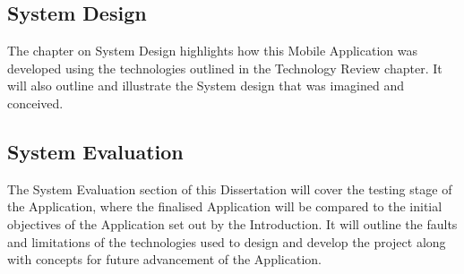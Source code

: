 \subsection{System Design}
The chapter on System Design highlights how this Mobile Application was developed using the technologies outlined in the Technology Review chapter. It will also outline and illustrate the System design that was imagined and conceived.
\subsection{System Evaluation}
The System Evaluation section of this Dissertation will cover the testing stage of the Application, where the finalised Application will be compared to the initial objectives of the Application set out by the Introduction. It will outline the faults and limitations of the technologies used to design and develop the project along with concepts for future advancement of the Application.

